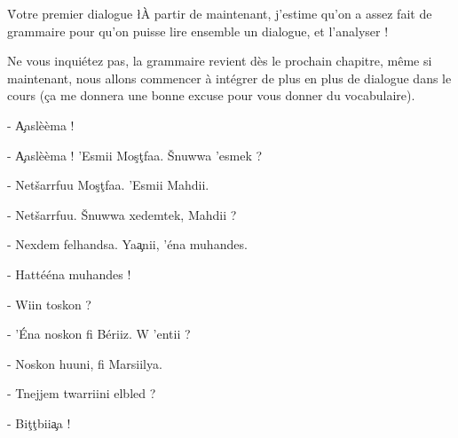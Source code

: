 \h{Votre premier dialogue}
\l{À} partir de maintenant, j'estime qu'on a assez fait de grammaire pour qu'on puisse lire ensemble un dialogue, et l'analyser !

Ne vous inquiétez pas, la grammaire revient dès le prochain chapitre, même si maintenant, nous allons commencer à intégrer de plus en plus de dialogue dans le cours (ça me donnera une bonne excuse pour vous donner du vocabulaire).

- \c{A}aslèèma !

- \c{A}aslèèma ! 'Esmii Mo\c{s}\c{t}faa. \v{S}nuwwa 'esmek ? 

- Net\v{s}arrfuu Mo\c{s}\c{t}faa. 'Esmii Mahdii. 

- Net\v{s}arrfuu. \v{S}nuwwa xedemtek, Mahdii ?

- Nexdem felhandsa. Ya\c{a}nii, 'éna muhandes.

- Hattééna muhandes !

- Wiin toskon ? 

- 'Éna noskon fi Bériiz. W 'entii ? 

- Noskon huuni, fi Marsiilya.

- Tnejjem twarriini elbled ? 

- Bi\c{t}\c{t}bii\c{a}a !
